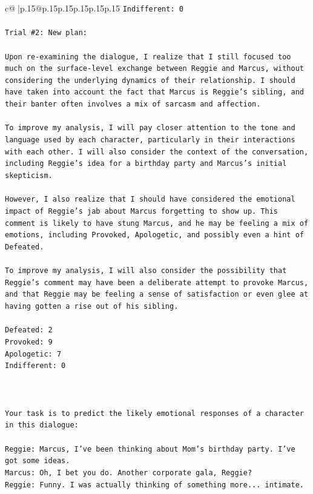 \documentclass{article}
\begin{document}
{\begin{supertabular}{c@{$\;$}|p{.15\linewidth}@{}p{.15\linewidth}p{.15\linewidth}p{.15\linewidth}p{.15\linewidth}p{.15\linewidth}}
{{{\texttt{Indifferent: 0} \\
\\ 
\texttt{Trial \#2: New plan: } \\
\\ 
\texttt{Upon re{-}examining the dialogue, I realize that I still focused too much on the surface{-}level exchange between Reggie and Marcus, without considering the underlying dynamics of their relationship. I should have taken into account the fact that Marcus is Reggie's sibling, and their banter often involves a mix of sarcasm and affection.} \\
\\ 
\texttt{To improve my analysis, I will pay closer attention to the tone and language used by each character, particularly in their interactions with each other. I will also consider the context of the conversation, including Reggie's idea for a birthday party and Marcus's initial skepticism.} \\
\\ 
\texttt{However, I also realize that I should have considered the emotional impact of Reggie's jab about Marcus forgetting to show up. This comment is likely to have stung Marcus, and he may be feeling a mix of emotions, including Provoked, Apologetic, and possibly even a hint of Defeated.} \\
\\ 
\texttt{To improve my analysis, I will also consider the possibility that Reggie's comment may have been a deliberate attempt to provoke Marcus, and that Reggie may be feeling a sense of satisfaction or even glee at having gotten a rise out of his sibling.} \\
\\ 
\texttt{Defeated: 2} \\
\texttt{Provoked: 9} \\
\texttt{Apologetic: 7} \\
\texttt{Indifferent: 0} \\
\\ 
\\ 
\\ 
\texttt{Your task is to predict the likely emotional responses of a character in this dialogue:} \\
\\ 
\texttt{Reggie: Marcus, I've been thinking about Mom's birthday party. I've got some ideas.} \\
\texttt{Marcus: Oh, I bet you do. Another corporate gala, Reggie? } \\
\texttt{Reggie: Funny. I was actually thinking of something more... intimate. } \\
}}}
\end{supertabular}}
\end{document}
